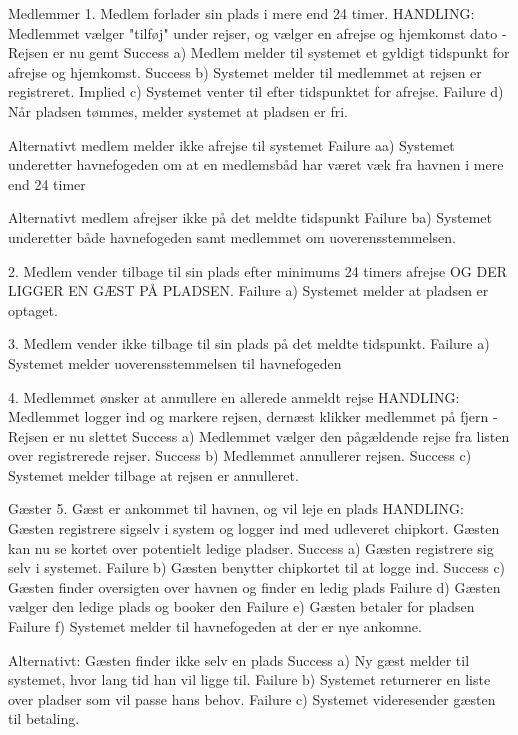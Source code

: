 		Medlemmer
1. Medlem forlader sin plads i mere end 24 timer.
		HANDLING: Medlemmet vælger "tilføj" under rejser, og vælger en afrejse og hjemkomst dato - Rejsen er nu gemt
			Success a) Medlem melder til systemet et gyldigt tidspunkt for afrejse og hjemkomst.
			Success b) Systemet melder til medlemmet at rejsen er registreret. 
			Implied c) Systemet venter til efter tidspunktet for afrejse.
			Failure d) Når pladsen tømmes, melder systemet at pladsen er fri.
			
		Alternativt medlem melder ikke afrejse til systemet
			Failure aa) Systemet underetter havnefogeden om at en medlemsbåd har været væk fra havnen i mere end 24 timer
		
		Alternativt medlem afrejser ikke på det meldte tidspunkt
			Failure ba) Systemet underetter både havnefogeden samt medlemmet om uoverensstemmelsen.
			
2. Medlem vender tilbage til sin plads efter minimums 24 timers afrejse OG DER LIGGER EN GÆST PÅ PLADSEN.
			Failure a) Systemet melder at pladsen er optaget.

3. Medlem vender ikke tilbage til sin plads på det meldte tidspunkt.
			Failure a) Systemet melder uoverensstemmelsen til havnefogeden

4. Medlemmet ønsker at annullere en allerede anmeldt rejse
		HANDLING: Medlemmet logger ind og markere rejsen, dernæst klikker medlemmet på fjern - Rejsen er nu slettet
			Success a) Medlemmet vælger den pågældende rejse fra listen over registrerede rejser.
			Success b) Medlemmet annullerer rejsen.
			Success c) Systemet melder tilbage at rejsen er annulleret.

		Gæster
5. Gæst er ankommet til havnen, og vil leje en plads
		HANDLING: Gæsten registrere sigselv i system og logger ind med udleveret chipkort. Gæsten kan nu se kortet over potentielt ledige pladser.
			Success a) Gæsten registrere sig selv i systemet.
			Failure b) Gæsten benytter chipkortet til at logge ind.
			Success c) Gæsten finder oversigten over havnen og finder en ledig plads
			Failure d) Gæsten vælger den ledige plads og booker den
			Failure e) Gæsten betaler for pladsen
			Failure f) Systemet melder til havnefogeden at der er nye ankomne.

		Alternativt: Gæsten finder ikke selv en plads
			Success a) Ny gæst melder til systemet, hvor lang tid han vil ligge til.
			Failure b) Systemet returnerer en liste over pladser som vil passe hans behov.
			Failure c) Systemet videresender gæsten til betaling.

